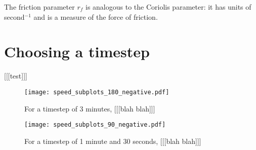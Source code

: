 The friction parameter $r_f$ is analogous to the Coriolis parameter: it has units of second$^{-1}$ and is a measure of the force of friction.

\section{Choosing a timestep} \label{sec:timestep}
[[[test]]]

\begin{figure}
    \texttt{[image: speed\_subplots\_180\_negative.pdf]}
    \centering
    \caption{For a timestep of 3 minutes, [[[blah blah]]]}
    \label{}
\end{figure}

\begin{figure}
    \texttt{[image: speed\_subplots\_90\_negative.pdf]}
    \centering
    \caption{For a timestep of 1 minute and 30 seconds, [[[blah blah]]]}
    \label{}
\end{figure}
